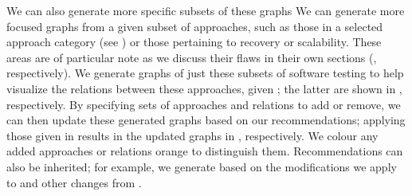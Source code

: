     We can also generate more specific subsets of these graphs
\else We can generate more focused graphs \fi from a given subset of
approaches, such as \ifnotpaper\else those in a selected approach category
    (see ) or \fi those pertaining to recovery or
scalability\ifnotpaper. These areas are of particular note as we discuss their
flaws in their own sections (, respectively).
We generate graphs of just these subsets of software testing to help visualize
the relations between these approaches, given \else; the latter are shown \fi
in , respectively. By
specifying sets of approaches and relations to add or remove, we can then
update these generated graphs based on our recommendations; applying those
given in 
results in the updated graphs in , respectively.
We colour any added approaches or relations orange to distinguish them.
Recommendations can also be inherited; for example, we generate
 based on the modifications we apply to
 and
other changes from .

\ifnotpaper
    
\else
    \flawMnfstsTable{}
    \flawDmnsTable{}
\fi
